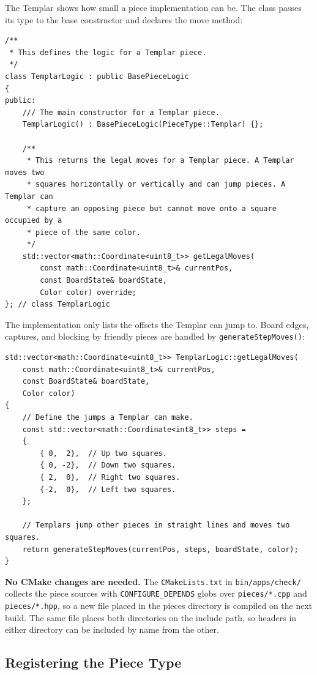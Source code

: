 The Templar shows how small a piece implementation can be. The class passes its type to the base constructor and declares the move method:

\begin{lstlisting}[style=cppstyle]
/**
 * This defines the logic for a Templar piece.
 */
class TemplarLogic : public BasePieceLogic
{
public:
    /// The main constructor for a Templar piece.
    TemplarLogic() : BasePieceLogic(PieceType::Templar) {};

    /**
     * This returns the legal moves for a Templar piece. A Templar moves two
     * squares horizontally or vertically and can jump pieces. A Templar can 
     * capture an opposing piece but cannot move onto a square occupied by a 
     * piece of the same color.
     */
    std::vector<math::Coordinate<uint8_t>> getLegalMoves(
        const math::Coordinate<uint8_t>& currentPos,
        const BoardState& boardState,
        Color color) override;
}; // class TemplarLogic
\end{lstlisting}

The implementation only lists the offsets the Templar can jump to. Board edges, captures, and blocking by friendly pieces are handled by \texttt{generateStepMoves()}:

\begin{lstlisting}[style=cppstyle]
std::vector<math::Coordinate<uint8_t>> TemplarLogic::getLegalMoves(
    const math::Coordinate<uint8_t>& currentPos,
    const BoardState& boardState,
    Color color)
{
    // Define the jumps a Templar can make.
    const std::vector<math::Coordinate<int8_t>> steps =
    {
        { 0,  2},  // Up two squares.
        { 0, -2},  // Down two squares.
        { 2,  0},  // Right two squares. 
        {-2,  0},  // Left two squares.
    };

    // Templars jump other pieces in straight lines and moves two squares.
    return generateStepMoves(currentPos, steps, boardState, color);
}
\end{lstlisting}

\textbf{No CMake changes are needed.} The \texttt{CMakeLists.txt} in \texttt{bin/apps/check/} collects the piece sources with \texttt{CONFIGURE\_DEPENDS} globs over \texttt{pieces/*.cpp} and \texttt{pieces/*.hpp}, so a new file placed in the pieces directory is compiled on the next build. The same file places both directories on the include path, so headers in either directory can be included by name from the other.


\subsection{Registering the Piece Type}\label{section:check_registering_piece_type}

